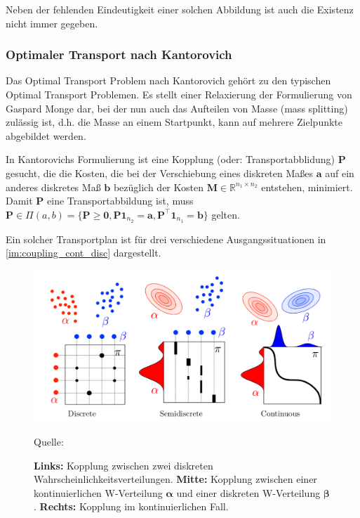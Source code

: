 \documentclass[11pt,a4paper]{article}
\newcommand{\source}[1]{\caption*{\hfill Quelle: {#1}} }
\numberwithin{equation}{section}
\begin{document}
	Neben der fehlenden Eindeutigkeit einer solchen Abbildung ist auch die Existenz nicht immer gegeben.
	
	\subsubsection{Optimaler Transport nach Kantorovich}
	
	Das Optimal Transport Problem nach Kantorovich gehört zu den typischen Optimal Transport Problemen. Es stellt einer Relaxierung der Formulierung von Gaspard Monge dar, bei der nun auch das Aufteilen von Masse (mass splitting) zulässig ist, d.h. die Masse an einem Startpunkt, kann auf mehrere Zielpunkte abgebildet werden.
	
	In Kantorovichs Formulierung ist eine Kopplung (oder: Transportabblidung) $\boldsymbol{P}$ gesucht, die die Kosten, die bei der Verschiebung eines diskreten Maßes $\boldsymbol{a}$ auf ein anderes diskretes Maß $\boldsymbol{b}$ bezüglich der Kosten $\boldsymbol{M} \in \mathbb{R}^{n_1 \times n_2}$ entstehen, minimiert.
	Damit $\boldsymbol{P}$ eine Transportabbildung ist, muss $\boldsymbol{P} \in \Pi(a,b) = \lbrace \boldsymbol{P} \geq \boldsymbol{0}, \boldsymbol{P}\boldsymbol{1}_{n_2} = \boldsymbol{a}, \boldsymbol{P}^\top\boldsymbol{1}_{n_1} = \boldsymbol{b} \rbrace$ gelten.
	
	Ein solcher Transportplan ist für drei verschiedene Ausgangssituationen in \autoref{im:coupling_cont_disc} dargestellt.
	
	\begin{figure}[ht]
		\centering
		\includegraphics[width=0.4\textheight]{coupling_disc_semid_cont.png}
		\caption[Transportpläne im diskreten, semi-diskreten und kontinuierlichen Fall]{\textbf{Links: }Kopplung zwischen zwei diskreten Wahrscheinlichkeitsverteilungen. \textbf{ Mitte: }Kopplung zwischen einer kontinuierlichen W-Verteilung $\boldsymbol{\alpha}$ und einer diskreten W-Verteilung $\boldsymbol{\beta}$. \textbf{Rechts: }Kopplung im kontinuierlichen Fall.}
		\source{\cite{COTcuturi}}
		\label{im:couplings}
	\end{figure}
	
\end{document}
